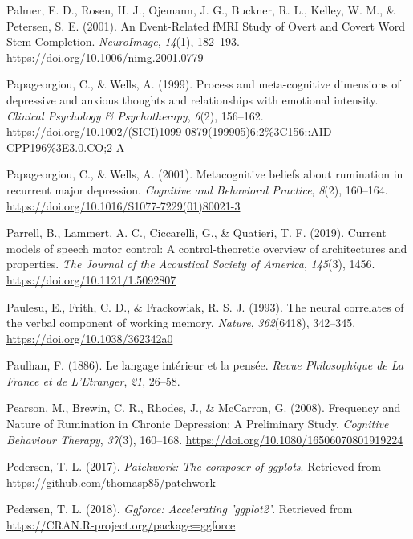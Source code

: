 \documentclass[a4paper,12pt,twoside,openright,oldfontcommands,final]{memoir}
\begin{document}
\leavevmode\hypertarget{ref-palmer_event-related_2001}{}%
Palmer, E. D., Rosen, H. J., Ojemann, J. G., Buckner, R. L., Kelley, W. M., \& Petersen, S. E. (2001). An Event-Related fMRI Study of Overt and Covert Word Stem Completion. \emph{NeuroImage}, \emph{14}(1), 182--193. \url{https://doi.org/10.1006/nimg.2001.0779}

\leavevmode\hypertarget{ref-papageorgiou_process_1999}{}%
Papageorgiou, C., \& Wells, A. (1999). Process and meta-cognitive dimensions of depressive and anxious thoughts and relationships with emotional intensity. \emph{Clinical Psychology \& Psychotherapy}, \emph{6}(2), 156--162. \url{https://doi.org/10.1002/(SICI)1099-0879(199905)6:2\%3C156::AID-CPP196\%3E3.0.CO;2-A}

\leavevmode\hypertarget{ref-papageorgiou_metacognitive_2001}{}%
Papageorgiou, C., \& Wells, A. (2001). Metacognitive beliefs about rumination in recurrent major depression. \emph{Cognitive and Behavioral Practice}, \emph{8}(2), 160--164. \url{https://doi.org/10.1016/S1077-7229(01)80021-3}

\leavevmode\hypertarget{ref-parrell_current_2019}{}%
Parrell, B., Lammert, A. C., Ciccarelli, G., \& Quatieri, T. F. (2019). Current models of speech motor control: A control-theoretic overview of architectures and properties. \emph{The Journal of the Acoustical Society of America}, \emph{145}(3), 1456. \url{https://doi.org/10.1121/1.5092807}

\leavevmode\hypertarget{ref-paulesu_neural_1993}{}%
Paulesu, E., Frith, C. D., \& Frackowiak, R. S. J. (1993). The neural correlates of the verbal component of working memory. \emph{Nature}, \emph{362}(6418), 342--345. \url{https://doi.org/10.1038/362342a0}

\leavevmode\hypertarget{ref-paulhan_langage_1886}{}%
Paulhan, F. (1886). Le langage intérieur et la pensée. \emph{Revue Philosophique de La France et de L'Etranger}, \emph{21}, 26--58.

\leavevmode\hypertarget{ref-pearson_frequency_2008}{}%
Pearson, M., Brewin, C. R., Rhodes, J., \& McCarron, G. (2008). Frequency and Nature of Rumination in Chronic Depression: A Preliminary Study. \emph{Cognitive Behaviour Therapy}, \emph{37}(3), 160--168. \url{https://doi.org/10.1080/16506070801919224}

\leavevmode\hypertarget{ref-R-patchwork}{}%
Pedersen, T. L. (2017). \emph{Patchwork: The composer of ggplots}. Retrieved from \url{https://github.com/thomasp85/patchwork}

\leavevmode\hypertarget{ref-R-ggforce}{}%
Pedersen, T. L. (2018). \emph{Ggforce: Accelerating 'ggplot2'}. Retrieved from \url{https://CRAN.R-project.org/package=ggforce}
\end{document}
